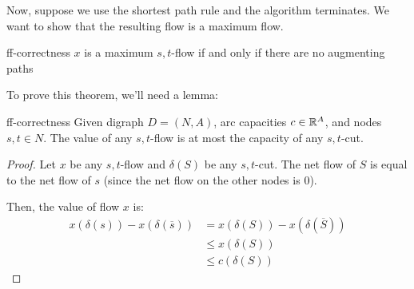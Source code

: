 Now, suppose we use the shortest path rule and the algorithm terminates. We want to show that the resulting flow is a maximum flow.
\begin{theorem}{}{ff-correctness}
    $x$ is a maximum $s,t$-flow if and only if there are no augmenting paths
\end{theorem}

To prove this theorem, we'll need a lemma:
\begin{lemma}{}{ff-correctness}
    Given digraph $D = (N,A)$, arc capacities $c \in \mathbb{R}^A$, and nodes $s,t \in N$. The value of any $s,t$-flow is at most the capacity of any $s,t$-cut.
\end{lemma}
\begin{proof}
    Let $x$ be any $s,t$-flow and $\delta(S)$ be any $s,t$-cut. The net flow of $S$ is equal to the net flow of $s$ (since the net flow on the other nodes is $0$).

    Then, the value of flow $x$ is:
    \begin{align*}
        x(\delta(s)) - x(\delta(\overline{s})) &= x(\delta(S)) - x(\delta(\overline{S})) \\
        &\leq x(\delta(S)) \\
        &\leq c(\delta(S))
    \end{align*}
\end{proof}

